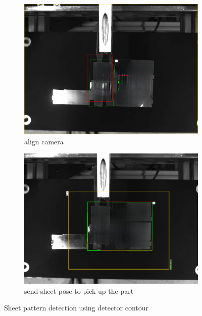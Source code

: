 \begin{figure}[h]
    \centering
    \begin{subfigure}[b]{0.48\textwidth}
        \centering
        \includegraphics[width=\textwidth]{figures/sheet-pickup/camera-align.png}
        \caption{align camera}
        \label{subfig:sheet-1}
    \end{subfigure}\hspace{0.1cm}
    \begin{subfigure}[b]{0.48\textwidth}
        \centering
        \includegraphics[width=\textwidth]{figures/sheet-pickup/sheet-pose.png}
        \caption{send sheet pose to pick up the part}
        \label{subfig:sheet-0}
    \end{subfigure}
    \caption{Sheet pattern detection using detector contour}
    \label{fig:sheet-scanning}
\end{figure}

